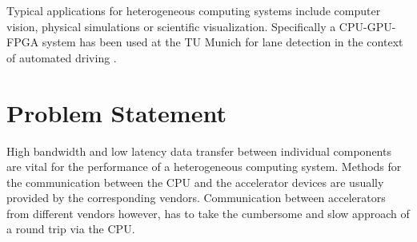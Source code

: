 Typical applications for heterogeneous computing systems include computer vision, physical simulations or scientific visualization.
Specifically a CPU-GPU-FPGA system has been used at the TU Munich for lane detection in the context of automated driving \cite{lanedetection}.



\section{Problem Statement}





High bandwidth and low latency data transfer between individual components are vital for the performance of a heterogeneous computing system.
Methods for the communication between the CPU and the accelerator devices are usually provided by the corresponding vendors.
Communication between accelerators from different vendors however, has to take the cumbersome and slow approach of a round trip via the CPU.





